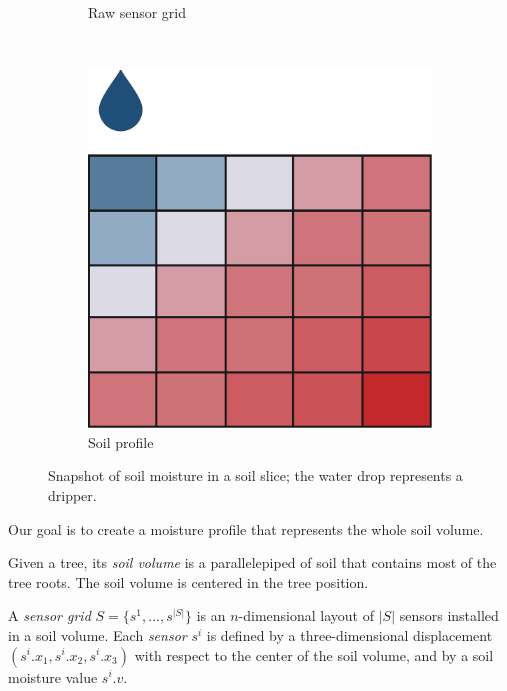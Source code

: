 \begin{figure}[t]
\begin{subfigure}[t]{.3\textwidth}
\caption{Raw sensor grid}
\label{pluto-fig:moisture-sens}
\end{subfigure}
~
\begin{subfigure}[t]{.3\textwidth}
\centering
\includegraphics[scale=.15]{chapters/physics-aware/pluto/img/soil-moisture-profile.pdf}
\caption{Soil profile}
\label{pluto-fig:moisture-profile}
\end{subfigure}
\caption{Snapshot of soil moisture in a soil slice; the water drop represents a dripper.}
\label{pluto-fig:moisture}
\end{figure}

Our goal is to create a moisture profile that represents the whole soil volume.
\begin{definition}
Given a tree, its \emph{soil volume} is a parallelepiped of soil that contains most of the tree roots. The soil volume is centered in the tree position.
\end{definition}

\begin{definition}
A \emph{sensor grid} $S = \{s^1, ..., s^{|S|}\}$ is an $n$-dimensional layout of $|S|$ sensors installed in a soil volume.
Each \emph{sensor} $s^i$ is defined by a three-dimensional displacement $(s^i.x_1, s^i.x_2,s^i.x_3)$ with respect to the center of the soil volume, and by a soil moisture value $s^i.v$.
\end{definition}



